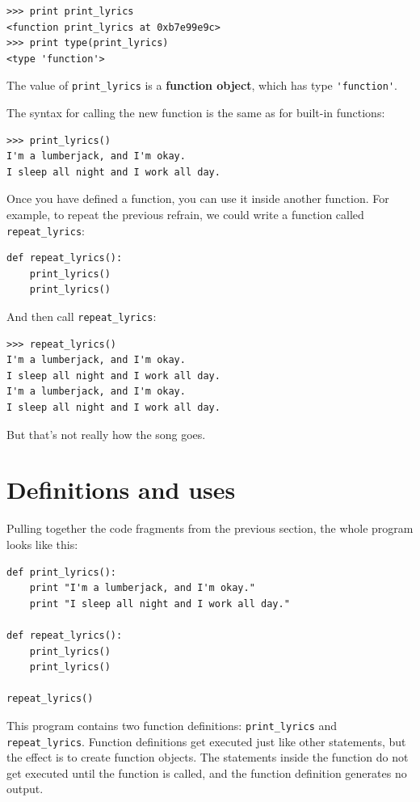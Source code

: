 \documentclass[10pt]{book}
\begin{document}
\beforeverb
\begin{verbatim}
>>> print print_lyrics
<function print_lyrics at 0xb7e99e9c>
>>> print type(print_lyrics)
<type 'function'>
\end{verbatim}
\afterverb
%
The value of \verb"print_lyrics" is a {\bf function object}, which
has type \verb"'function'".


The syntax for calling the new function is the same as
for built-in functions:

\beforeverb
\begin{verbatim}
>>> print_lyrics()
I'm a lumberjack, and I'm okay.
I sleep all night and I work all day.
\end{verbatim}
\afterverb
%
Once you have defined a function, you can use it inside another
function.  For example, to repeat the previous refrain, we could write
a function called \verb"repeat_lyrics":

\beforeverb
\begin{verbatim}
def repeat_lyrics():
    print_lyrics()
    print_lyrics()
\end{verbatim}
\afterverb
%
And then call \verb"repeat_lyrics":

\beforeverb
\begin{verbatim}
>>> repeat_lyrics()
I'm a lumberjack, and I'm okay.
I sleep all night and I work all day.
I'm a lumberjack, and I'm okay.
I sleep all night and I work all day.
\end{verbatim}
\afterverb
%
But that's not really how the song goes.


\section{Definitions and uses}

Pulling together the code fragments from the previous section, the
whole program looks like this:

\beforeverb
\begin{verbatim}
def print_lyrics():
    print "I'm a lumberjack, and I'm okay."
    print "I sleep all night and I work all day."

def repeat_lyrics():
    print_lyrics()
    print_lyrics()

repeat_lyrics()
\end{verbatim}
\afterverb
%
This program contains two function definitions: \verb"print_lyrics" and
\verb"repeat_lyrics".  Function definitions get executed just like other
statements, but the effect is to create function objects.  The statements
inside the function do not get executed until the function is called, and
the function definition generates no output.
\end{document}
